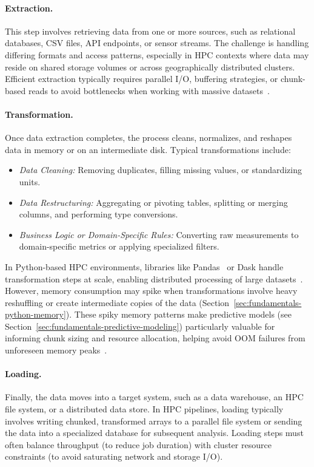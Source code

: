 \paragraph{Extraction.}
This step involves retrieving data from one or more sources, such as relational databases, \ac{CSV} files, \ac{API} endpoints, or sensor streams.
The challenge is handling differing formats and access patterns, especially in \ac{HPC} contexts where data may reside on shared storage volumes or across geographically distributed clusters.
Efficient extraction typically requires parallel \ac{I/O}, buffering strategies, or chunk-based reads to avoid bottlenecks when working with massive datasets~\cite{Dean2004}.

\paragraph{Transformation.}
Once data extraction completes, the process cleans, normalizes, and reshapes data in memory or on an intermediate disk.
Typical transformations include:
\begin{itemize}
    \item \emph{Data Cleaning:} Removing duplicates, filling missing values, or standardizing units.
    \item \emph{Data Restructuring:} Aggregating or pivoting tables, splitting or merging columns, and performing type conversions.
    \item \emph{Business Logic or Domain-Specific Rules:} Converting raw measurements to domain-specific metrics or applying specialized filters.
\end{itemize}
In Python-based \ac{HPC} environments, libraries like Pandas~\cite{pandas} or Dask handle transformation steps at scale, enabling distributed processing of large datasets~\cite{rocklin2015dask}.
However, memory consumption may spike when transformations involve heavy reshuffling or create intermediate copies of the data (Section~\ref{sec:fundamentals-python-memory}).
These spiky memory patterns make predictive models (see Section~\ref{sec:fundamentals-predictive-modeling}) particularly valuable for informing chunk sizing and resource allocation, helping avoid \ac{OOM} failures from unforeseen memory peaks~\cite{Bader2023,Bader2024}.

\paragraph{Loading.}
Finally, the data moves into a target system, such as a data warehouse, an \ac{HPC} file system, or a distributed data store.
In \ac{HPC} pipelines, loading typically involves writing chunked, transformed arrays to a parallel file system or sending the data into a specialized database for subsequent analysis.
Loading steps must often balance throughput (to reduce job duration) with cluster resource constraints (to avoid saturating network and storage \ac{I/O}).

